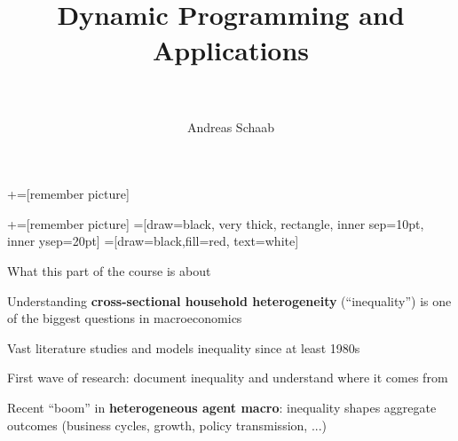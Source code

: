 \documentclass[11pt, aspectratio=169]{beamer}
\title[]{\\[8pt]
	{\large \color{blue} Dynamic Programming and Applications \\[5pt] \normalfont{Heterogeneous Agents and Inequality} \\[10pt] \normalfont{Lecture 10}}}
\author[Schaab]{Andreas Schaab}
\institute{}
\date{}
\newenvironment{witemize}{\itemize\addtolength{\itemsep}{10pt}}{\enditemize}
\begin{document}
+=[remember picture]

\newcommand\marktopleft[1]{%
	\tikz[overlay,remember picture] 
	\node (marker-#1-a) at (-.3em,.3em) {};%
}
\newcommand\markbottomright[2]{%
	\tikz[overlay,remember picture] 
	\node (marker-#1-b) at (0em,0em) {};%
}
+=[remember picture] 
 =[draw=black, very thick, rectangle, inner sep=10pt, inner ysep=20pt]
 =[draw=black,fill=red, text=white]


\addtocounter{framenumber}{-1}
\thispagestyle{empty}
\maketitle 
\newpage

\begin{frame}{What this part of the course is about}
\begin{witemize}
\item Understanding \textbf{cross-sectional household heterogeneity} (``inequality'') is one of the biggest questions in macroeconomics 

\item Vast literature studies and models inequality since at least 1980s

\item First wave of research: document inequality and understand where it comes from

\item Recent ``boom'' in \textbf{heterogeneous agent macro}: inequality shapes aggregate outcomes (business cycles, growth, policy transmission, ...)
\end{witemize}
\end{frame}
\end{document}
